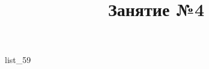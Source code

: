 \documentclass[12pt, a4paper]{article}
\begin{document}
	\title{Занятие №4}
	{list_59}
\end{document}
